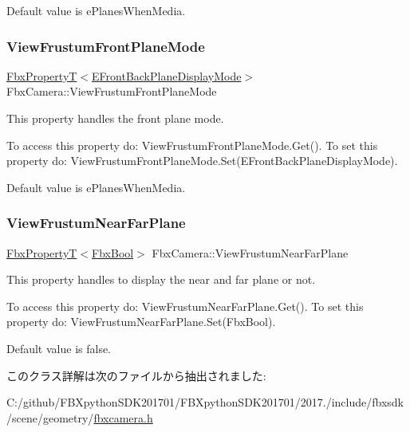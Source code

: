 Default value is e\+Planes\+When\+Media. \mbox{\label{class_fbx_camera_a7d91e0645351854d02925da94d4cb924}} 
\subsubsection{\texorpdfstring{View\+Frustum\+Front\+Plane\+Mode}{ViewFrustumFrontPlaneMode}}
{\footnotesize\ttfamily \hyperlink{class_fbx_property_t}{Fbx\+PropertyT}$<$\hyperlink{class_fbx_camera_ab7b9d3e546552049a79261a444f9b44a}{E\+Front\+Back\+Plane\+Display\+Mode}$>$ Fbx\+Camera\+::\+View\+Frustum\+Front\+Plane\+Mode}

This property handles the front plane mode.

To access this property do\+: View\+Frustum\+Front\+Plane\+Mode.\+Get(). To set this property do\+: View\+Frustum\+Front\+Plane\+Mode.\+Set(\+E\+Front\+Back\+Plane\+Display\+Mode).

Default value is e\+Planes\+When\+Media. \mbox{\label{class_fbx_camera_aaf010c106bab5fca32acadc0b97d8437}} 
\subsubsection{\texorpdfstring{View\+Frustum\+Near\+Far\+Plane}{ViewFrustumNearFarPlane}}
{\footnotesize\ttfamily \hyperlink{class_fbx_property_t}{Fbx\+PropertyT}$<$\hyperlink{fbxtypes_8h_a92e0562b2fe33e76a242f498b362262e}{Fbx\+Bool}$>$ Fbx\+Camera\+::\+View\+Frustum\+Near\+Far\+Plane}

This property handles to display the near and far plane or not.

To access this property do\+: View\+Frustum\+Near\+Far\+Plane.\+Get(). To set this property do\+: View\+Frustum\+Near\+Far\+Plane.\+Set(\+Fbx\+Bool).

Default value is false. 

このクラス詳解は次のファイルから抽出されました\+:\begin{DoxyCompactItemize}
\item 
C\+:/github/\+F\+B\+Xpython\+S\+D\+K201701/\+F\+B\+Xpython\+S\+D\+K201701/2017./include/fbxsdk/scene/geometry/\hyperlink{fbxcamera_8h}{fbxcamera.\+h}\end{DoxyCompactItemize}
